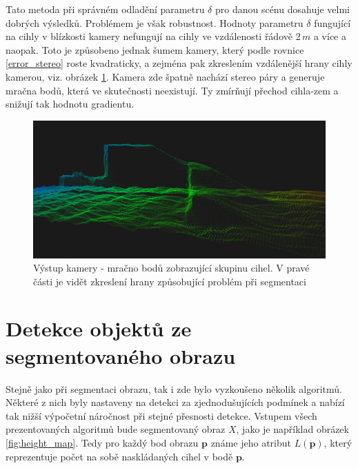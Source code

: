 \documentclass[twoside]{ctuthesis}
\newcommand{\tl}[1]{$\mathbf{#1}$}
\begin{document}
Tato metoda při správném odladění parametru $\delta$ pro danou scénu dosahuje velmi dobrých výsledků. Problémem je však robustnost. Hodnoty parametru $\delta$ fungující na cihly v blízkosti kamery nefungují na cihly ve vzdálenosti řádově 2\,$m$ a více a naopak. Toto je způsobeno jednak šumem kamery, který podle rovnice \ref{error_stereo} roste kvadraticky, a zejména pak zkreslením vzdálenější hrany cihly kamerou, viz. obrázek \ref{fig:point_cloud_grad}. Kamera zde špatně nachází stereo páry a generuje mračna bodů, která ve skutečnosti neexistují. Ty zmírňují přechod cihla-zem a snižují tak hodnotu gradientu. 
\begin{figure}
    \centering
    \includegraphics[width = \linewidth]{pictures/pc_crop.png}
    \caption[Výstup kamery]{Výstup kamery - mračno bodů zobrazující skupinu cihel. V pravé části je vidět zkreslení hrany způsobující problém při segmentaci}
    \label{fig:point_cloud_grad}
\end{figure}


\section{Detekce objektů ze segmentovaného obrazu}
Stejně jako při segmentaci obrazu, tak i zde bylo vyzkoušeno několik algoritmů. Některé z nich byly nastaveny na detekci za zjednodušujících podmínek a nabízí tak nižší výpočetní náročnost při stejné přesnosti detekce. 
Vstupem všech prezentovaných algoritmů bude segmentovaný obraz $X$, jako je například obrázek \ref{fig:height_map}. Tedy pro každý bod obrazu \tl{p} známe jeho atribut $L(\mathbf{p})$, který reprezentuje počet na sobě naskládaných cihel v bodě \tl{p}. %
\end{document}
